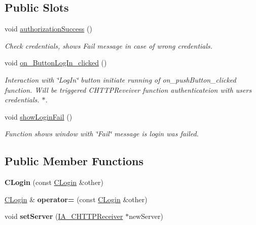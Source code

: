 \subsection*{Public Slots}
\begin{DoxyCompactItemize}
\item 
\mbox{\label{classCLogin_a281303ef5a46debfef8c892392800312}} 
void \hyperlink{classCLogin_a281303ef5a46debfef8c892392800312}{authorization\+Success} ()
\begin{DoxyCompactList}\small\item\em Check credentials, shows Fail message in case of wrong credentials. \end{DoxyCompactList}\item 
\mbox{\label{classCLogin_af4590fc3b5430ddeb1a9bf661091098c}} 
void \hyperlink{classCLogin_af4590fc3b5430ddeb1a9bf661091098c}{on\+\_\+\+Button\+Log\+In\+\_\+clicked} ()
\begin{DoxyCompactList}\small\item\em Interaction with \char`\"{}\+Log\+In\char`\"{} button initiate running of on\+\_\+push\+Button\+\_\+clicked function. Will be triggered C\+H\+T\+T\+P\+Reveiver function authenticateion with user\textquotesingle{}s credentials. $\ast$. \end{DoxyCompactList}\item 
\mbox{\label{classCLogin_a5f4c954ef3c2047fefc30cae5a62e7c3}} 
void \hyperlink{classCLogin_a5f4c954ef3c2047fefc30cae5a62e7c3}{show\+Login\+Fail} ()
\begin{DoxyCompactList}\small\item\em Function shows window with \char`\"{}\+Fail\char`\"{} message is login was failed. \end{DoxyCompactList}\end{DoxyCompactItemize}
\subsection*{Public Member Functions}
\begin{DoxyCompactItemize}
\item 
\mbox{\label{classCLogin_aee9f70e0611e2e82fef3d9285edbc120}} 
{\bfseries C\+Login} (const \hyperlink{classCLogin}{C\+Login} \&other)
\item 
\mbox{\label{classCLogin_a67d7f2140fff0ae7df1b4ff9f8914c05}} 
\hyperlink{classCLogin}{C\+Login} \& {\bfseries operator=} (const \hyperlink{classCLogin}{C\+Login} \&other)
\item 
\mbox{\label{classCLogin_abfb19f8c6166042fce6e5a78230288a8}} 
void {\bfseries set\+Server} (\hyperlink{classIA__CHTTPReceiver}{I\+A\+\_\+\+C\+H\+T\+T\+P\+Receiver} $\ast$new\+Server)
\end{DoxyCompactItemize}
